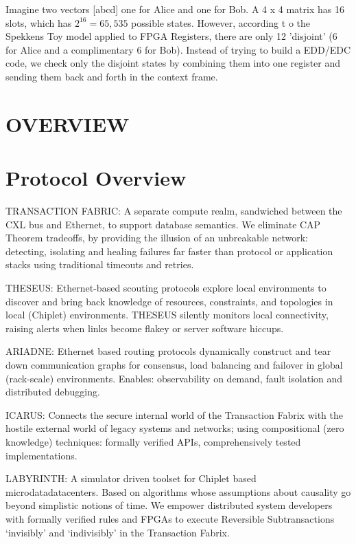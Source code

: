 \documentclass[../HFT-main.tex]{subfiles}
\begin{document}
Imagine two vectors [abcd] one for Alice and one for Bob. A 4 x 4 matrix has 16 slots, which has $2^{16} = 65,535$ possible states. However, according t o the Spekkens Toy model applied to FPGA Registers, there are only 12 'disjoint' (6 for Alice and a complimentary 6 for Bob). Instead of trying to build a EDD/EDC code, we check only the disjoint states by combining them into one register and sending them back and forth in the context frame.



\section{OVERVIEW}

\section{Protocol Overview}
\begin{description}
\item TRANSACTION FABRIC: A separate compute realm, sandwiched between the CXL bus and Ethernet, to support database semantics. We eliminate CAP Theorem tradeoffs, by providing the illusion of an unbreakable network: detecting, isolating and healing failures far faster than protocol or application stacks using traditional timeouts and retries.

\item THESEUS: Ethernet-based scouting protocols explore local environments to discover and bring back knowledge of resources, constraints, and topologies in local (Chiplet) environments. THESEUS silently monitors local connectivity, raising alerts when links become flakey or server software hiccups.

\item ARIADNE: Ethernet based routing protocols dynamically construct and tear down communication graphs for consensus, load balancing and failover in global (rack-scale) environments. Enables: observability on demand, fault isolation and distributed debugging.

\item ICARUS: Connects the secure internal world of the Transaction Fabrix with the hostile external world of legacy systems and networks; using compositional (zero knowledge) techniques: formally verified APIs, comprehensively tested implementations.

\item LABYRINTH: A simulator driven toolset for Chiplet based microdatadatacenters. Based on algorithms whose assumptions about causality go beyond simplistic notions of time. We empower distributed system developers with formally verified rules and FPGAs to execute Reversible Subtransactions ‘invisibly’ and ‘indivisibly’ in the Transaction Fabrix. 

\end{description}
\end{document}
